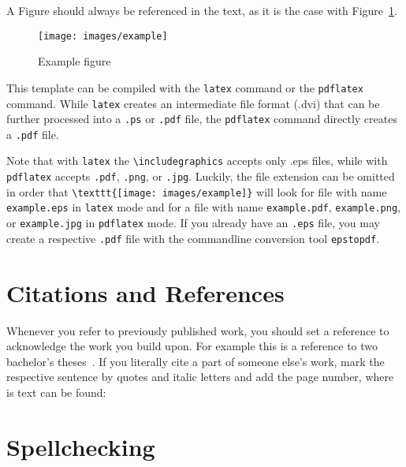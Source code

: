 A Figure should always be referenced in the text, as it is the case
with Figure~\ref{fig:example}.

\begin{figure}[ht]
 \centerline{\texttt{[image: images/example]}}
  \caption{Example figure}
  \label{fig:example}
\end{figure}

This template can be compiled with the \texttt{latex} command or the
\texttt{pdflatex} command. While \texttt{latex} creates an
intermediate file format (.dvi) that can be further processed into a
\texttt{.ps} or \texttt{.pdf} file, the \texttt{pdflatex} command
directly creates a \texttt{.pdf} file.

Note that with \texttt{latex} the \verb+\includegraphics+ accepts
only .eps files, while with \texttt{pdflatex} accepts \texttt{.pdf},
\texttt{.png}, or \texttt{.jpg}. Luckily, the file extension can be
omitted in order that \verb+\texttt{[image: images/example]}+ will
look for file with name \texttt{example.eps} in \texttt{latex} mode
and for a file with name \texttt{example.pdf}, \texttt{example.png},
or \texttt{example.jpg} in \texttt{pdflatex} mode. If you already
have an \texttt{.eps} file, you may create a respective
\texttt{.pdf} file with the commandline conversion tool
\texttt{epstopdf}.

\section{Citations and References}

Whenever you refer to previously published work, you should set a
reference to acknowledge the work you build upon. For example this
is a reference to two bachelor's theses~\cite{kraut:2003,
weirich:2005}. If you literally cite a part of someone else's work,
mark the respective sentence by quotes and italic letters and add
the page number, where is text can be found:

\cite[p.\,175]{elmenreich:2005}

\section{Spellchecking}

